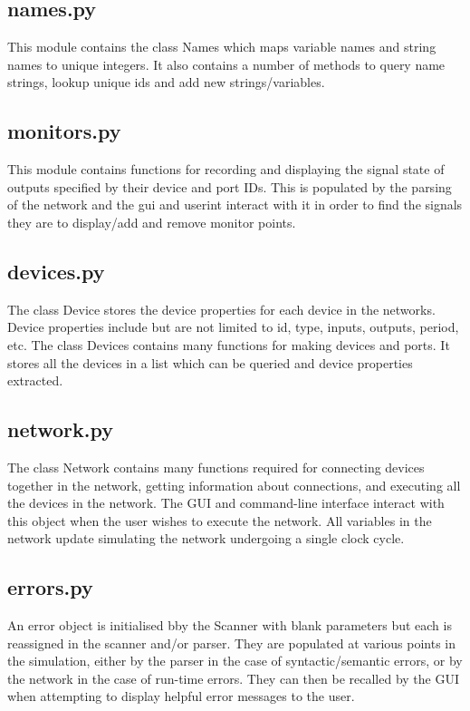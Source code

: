 \documentclass{article}					%
\begin{document}
\subsection{names.py}
This module contains the class Names which maps variable names and string names to unique integers. It also contains a number of methods to query name strings, lookup unique ids and add new strings/variables.

\subsection{monitors.py}
This module contains functions for recording and displaying the signal state of outputs specified by their device and port IDs. This is populated by the parsing of the network and the gui and userint interact with it in order to find the signals they are to display/add and remove monitor points.

\subsection{devices.py}
The class Device stores the device properties for each device in the networks. Device properties include but are not limited to id, type, inputs, outputs, period, etc. The class Devices contains many functions for making devices and ports. It stores all the devices in a list which can be queried and device properties extracted.

\subsection{network.py}
The class Network contains many functions required for connecting devices together in the network, getting information about connections, and executing all the devices in the network. The GUI and command-line interface interact with this object when the user wishes to execute the network. All variables in the network update simulating the network undergoing a single clock cycle.

\subsection{errors.py}
An error object is initialised bby the Scanner with blank parameters but each is reassigned in the scanner and/or parser. They are populated at various points in the simulation, either by the parser in the case of syntactic/semantic errors, or by the network in the case of run-time errors. They can then be recalled by the GUI when attempting to display helpful error messages to the user.
\end{document}
